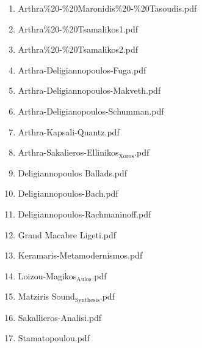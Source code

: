 \documentclass[11pt]{article}
\begin{document}
\begin{enumerate}
\begin{enumerate}
\begin{enumerate}
\item Arthra\%20-\%20Maronidis\%20-\%20Tasoudis.pdf
\label{sec-1-1-1-1-49-2-2-1-72-10}

\item Arthra\%20-\%20Tsamalikos1.pdf
\label{sec-1-1-1-1-49-2-2-1-72-11}

\item Arthra\%20-\%20Tsamalikos2.pdf
\label{sec-1-1-1-1-49-2-2-1-72-12}

\item Arthra-Deligiannopoulos-Fuga.pdf
\label{sec-1-1-1-1-49-2-2-1-72-13}

\item Arthra-Deligiannopoulos-Makveth.pdf
\label{sec-1-1-1-1-49-2-2-1-72-14}

\item Arthra-Deligianopoulos-Schumman.pdf
\label{sec-1-1-1-1-49-2-2-1-72-15}

\item Arthra-Kapsali-Quantz.pdf
\label{sec-1-1-1-1-49-2-2-1-72-16}

\item Arthra-Sakalieros-Ellinikos$_{\text{Xoros}}$.pdf
\label{sec-1-1-1-1-49-2-2-1-72-17}

\item Deligiannopoulos Ballads.pdf
\label{sec-1-1-1-1-49-2-2-1-72-18}

\item Deligiannopoulos-Bach.pdf
\label{sec-1-1-1-1-49-2-2-1-72-19}

\item Deligiannopoulos-Rachmaninoff.pdf
\label{sec-1-1-1-1-49-2-2-1-72-20}

\item Grand Macabre Ligeti.pdf
\label{sec-1-1-1-1-49-2-2-1-72-21}

\item Keramaris-Metamodernismos.pdf
\label{sec-1-1-1-1-49-2-2-1-72-22}

\item Loizou-Magikos$_{\text{Aulos}}$.pdf
\label{sec-1-1-1-1-49-2-2-1-72-23}

\item Matziris Sound$_{\text{Synthesis}}$.pdf
\label{sec-1-1-1-1-49-2-2-1-72-24}

\item Sakallieros-Analisi.pdf
\label{sec-1-1-1-1-49-2-2-1-72-25}

\item Stamatopoulou.pdf
\label{sec-1-1-1-1-49-2-2-1-72-26}


\end{enumerate}
\end{enumerate}
\end{enumerate}
\end{document}
